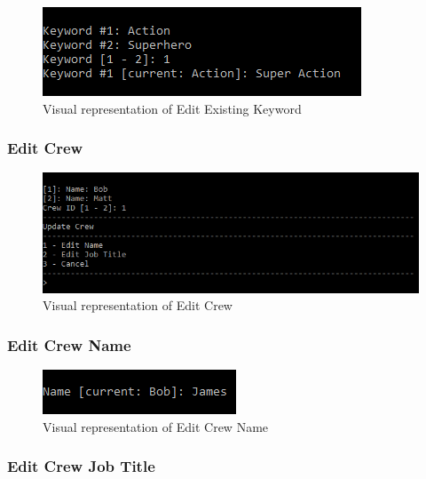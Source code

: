 \documentclass[
  english,
  a4paper,
,tablecaptionabove
]{scrartcl}
\begin{document}
\begin{figure}
\centering
\includegraphics{images/ui-screenshots/update-existing-keyword.png}
\caption{Visual representation of Edit Existing Keyword}
\end{figure}

\newpage

\hypertarget{edit-crew}{%
\subsubsection{Edit Crew}\label{edit-crew}}

\begin{figure}
\centering
\includegraphics{images/ui-screenshots/update-crew.png}
\caption{Visual representation of Edit Crew}
\end{figure}

\newpage

\hypertarget{edit-crew-name}{%
\subsubsection{Edit Crew Name}\label{edit-crew-name}}

\begin{figure}
\centering
\includegraphics{images/ui-screenshots/update-crew-name.png}
\caption{Visual representation of Edit Crew Name}
\end{figure}

\newpage

\hypertarget{edit-crew-job-title}{%
\subsubsection{Edit Crew Job Title}\label{edit-crew-job-title}}
\end{document}
